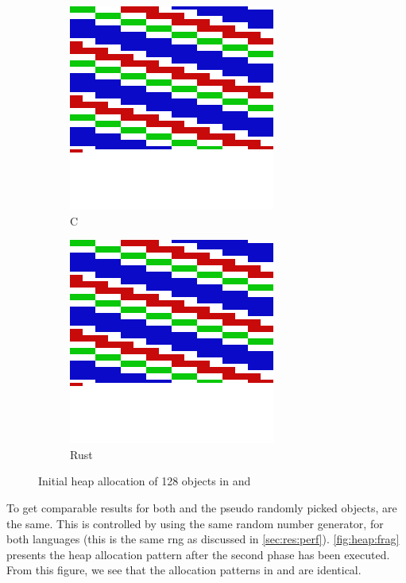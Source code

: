 \begin{figure}[H]

  \centering
  \begin{subfigure}{0.47\textwidth}
    \centering
    \includegraphics[scale=0.15]{results/plots/heap/cinit}
    \caption{C}
    \label{fig:heap:init:c}
  \end{subfigure}
  \hfill
  \begin{subfigure}{0.47\textwidth}
      \centering
    \includegraphics[scale=0.15]{results/plots/heap/rinit}
    \caption{Rust}
    \label{fig:heap:init:r}
  \end{subfigure}
  \caption{Initial heap allocation of 128 objects in {\rust} and {\C}}
  \label{fig:heap:init}

\end{figure}

To get comparable results for both {\C} and {\rust} the pseudo randomly picked objects, are the same.
This is controlled by using the same random number generator, for both languages (this is the same \gls{rng} as discussed in \autoref{sec:res:perf}).
\autoref{fig:heap:frag} presents the heap allocation pattern after the second phase has been executed.
From this figure, we see that the allocation patterns in {\rust} and {\C} are identical.

